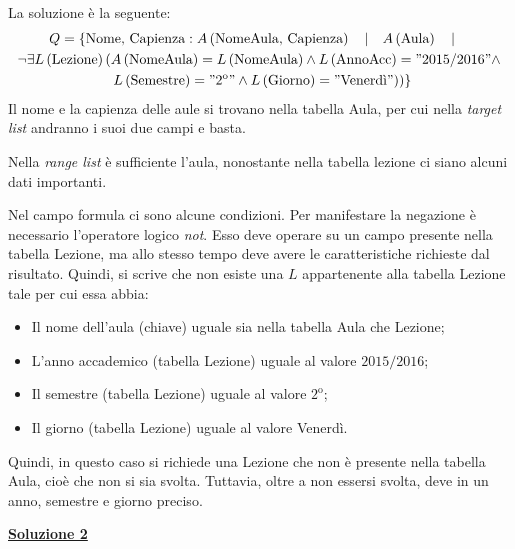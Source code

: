 \documentclass[a4paper]{article}
\begin{document}
	\noindent
	La soluzione è la seguente:
	\begin{gather*}
		Q = \left\{
		\text{Nome, Capienza}: A\left(\text{NomeAula, Capienza}\right) \hspace{1em} | \hspace{1em} A\left(\text{Aula}\right) \hspace{1em} | \hspace{1em} \right. \\
		\lnot\exists L\left(\text{Lezione}\right)\left(A\left(\text{NomeAula}\right) = L\left(\text{NomeAula}\right) \land L\left(\text{AnnoAcc}\right) = "2015/2016" \land \right. \\
		\left. \left.\left. L\left(\text{Semestre}\right) = "2^{\mathrm{o}}" \land L\left(\text{Giorno}\right) = "\text{Venerdì}"\right) 
		\right)\right\}
	\end{gather*}
	Il nome e la capienza delle aule si trovano nella tabella Aula, per cui nella \emph{target list} andranno i suoi due campi e basta.\newline
	
	\noindent
	Nella \emph{range list} è sufficiente l'aula, nonostante nella tabella lezione ci siano alcuni dati importanti.\newline
	
	\noindent
	Nel campo formula ci sono alcune condizioni. Per manifestare la negazione è necessario l'operatore logico \emph{not}. Esso deve operare su un campo presente nella tabella Lezione, ma allo stesso tempo deve avere le caratteristiche richieste dal risultato. Quindi, si scrive che non esiste una $L$ appartenente alla tabella Lezione tale per cui essa abbia:
	\begin{itemize}
		\item Il nome dell'aula (chiave) uguale sia nella tabella Aula che Lezione;
		\item L'anno accademico (tabella Lezione) uguale al valore $2015/2016$;
		\item Il semestre (tabella Lezione) uguale al valore $2^{\mathrm{o}}$;
		\item Il giorno (tabella Lezione) uguale al valore Venerdì.
	\end{itemize}
	Quindi, in questo caso si richiede una Lezione che non è presente nella tabella Aula, cioè che non si sia svolta. Tuttavia, oltre a non essersi svolta, deve in un anno, semestre e giorno preciso.\newpage
	
	\noindent
	\textcolor{Green4}{\textbf{\underline{Soluzione 2}}}\newline
	
\end{document}
